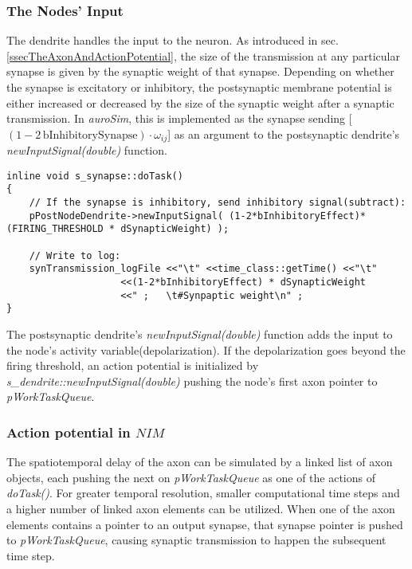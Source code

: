 		\subsubsection{The Nodes' Input}
		The dendrite handles the input to the neuron.
		As introduced in sec. \ref{ssecTheAxonAndActionPotential}, the size of the transmission at any particular synapse is given by the synaptic weight of that synapse.
		Depending on whether the synapse is excitatory or inhibitory, the postsynaptic membrane potential is either increased or decreased 
			by the size of the synaptic weight after a synaptic transmission.
		In \emph{auroSim}, this is implemented as the synapse sending [$(1-2\, \text{bInhibitorySynapse})\cdot \omega_{ij}$] as an argument to the postsynaptic dendrite's \emph{newInputSignal(double)} function.
\begin{lstlisting}
inline void s_synapse::doTask()
{
	// If the synapse is inhibitory, send inhibitory signal(subtract):
 	pPostNodeDendrite->newInputSignal( (1-2*bInhibitoryEffect)*(FIRING_THRESHOLD * dSynapticWeight) );

	// Write to log:
	synTransmission_logFile <<"\t" <<time_class::getTime() <<"\t"
					<<(1-2*bInhibitoryEffect) * dSynapticWeight
					<<" ;   \t#Synpaptic weight\n" ;
}
\end{lstlisting}
		The postsynaptic dendrite's \emph{newInputSignal(double)} function adds the input to the node's activity variable(depolarization).
		If the depolarization goes beyond the firing threshold, an action potential is initialized by \emph{s\_dendrite::newInputSignal(double)} 
			pushing the node's first axon pointer to \emph{pWorkTaskQueue}.

		\subsubsection{Action potential in $NIM$}
		The spatiotemporal delay of the axon can be simulated by a linked list of axon objects, each pushing the next on \emph{pWorkTaskQueue} as one of the actions of \emph{doTask()}.
		For greater temporal resolution, smaller computational time steps and a higher number of linked axon elements can be utilized.
		When one of the axon elements contains a pointer to an output synapse, that synapse pointer is pushed to \emph{pWorkTaskQueue},
			causing synaptic transmission to happen the subsequent time step.


